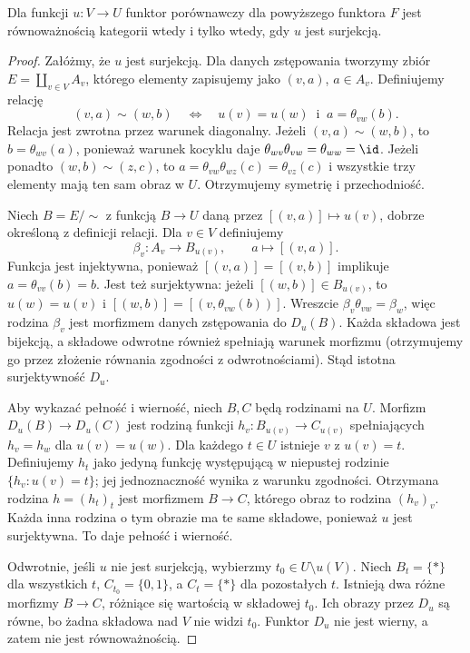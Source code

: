 \begin{twierdzenie}\label{cat:thm:set-effective-descent}
Dla funkcji $u:V\to U$ funktor porównawczy dla powyższego funktora $F$ jest równoważnością kategorii wtedy i tylko wtedy, gdy $u$ jest surjekcją.
\end{twierdzenie}
\begin{proof}
Załóżmy, że $u$ jest surjekcją. Dla danych zstępowania tworzymy zbiór $E=\coprod_{v\in V}A_v$, którego elementy zapisujemy jako $(v,a)$, $a\in A_v$. Definiujemy relację
\[
 (v,a)\sim(w,b)\quad\Longleftrightarrow\quad
 u(v)=u(w)\ \text{ i }\ a=\theta_{vw}(b).
\]
Relacja jest zwrotna przez warunek diagonalny. Jeżeli $(v,a)\sim(w,b)$, to $b=\theta_{wv}(a)$, ponieważ warunek kocyklu daje $\theta_{wv}\theta_{vw}=\theta_{ww}=\id$. Jeżeli ponadto $(w,b)\sim(z,c)$, to $a=\theta_{vw}\theta_{wz}(c)=\theta_{vz}(c)$ i wszystkie trzy elementy mają ten sam obraz w $U$. Otrzymujemy symetrię i przechodniość.

Niech $B=E/{\sim}$ z funkcją $B\to U$ daną przez $[(v,a)]\mapsto u(v)$, dobrze określoną z definicji relacji. Dla $v\in V$ definiujemy
\[
 \beta_v:A_v\longrightarrow B_{u(v)},\qquad
 a\longmapsto[(v,a)].
\]
Funkcja jest injektywna, ponieważ $[(v,a)]=[(v,b)]$ implikuje $a=\theta_{vv}(b)=b$. Jest też surjektywna: jeżeli $[(w,b)]\in B_{u(v)}$, to $u(w)=u(v)$ i $[(w,b)]=[(v,\theta_{vw}(b))]$. Wreszcie $\beta_v\theta_{vw}=\beta_w$, więc rodzina $\beta_v$ jest morfizmem danych zstępowania do $D_u(B)$. Każda składowa jest bijekcją, a składowe odwrotne również spełniają warunek morfizmu (otrzymujemy go przez złożenie równania zgodności z odwrotnościami). Stąd istotna surjektywność $D_u$.

Aby wykazać pełność i wierność, niech $B,C$ będą rodzinami na $U$. Morfizm $D_u(B)\to D_u(C)$ jest rodziną funkcji $h_v:B_{u(v)}\to C_{u(v)}$ spełniających $h_v=h_w$ dla $u(v)=u(w)$. Dla każdego $t\in U$ istnieje $v$ z $u(v)=t$. Definiujemy $h_t$ jako jedyną funkcję występującą w niepustej rodzinie $\{h_v:u(v)=t\}$; jej jednoznaczność wynika z warunku zgodności. Otrzymana rodzina $h=(h_t)_t$ jest morfizmem $B\to C$, którego obraz to rodzina $(h_v)_v$. Każda inna rodzina o tym obrazie ma te same składowe, ponieważ $u$ jest surjektywna. To daje pełność i wierność.

Odwrotnie, jeśli $u$ nie jest surjekcją, wybierzmy $t_0\in U\setminus u(V)$. Niech $B_t=\{*\}$ dla wszystkich $t$, $C_{t_0}=\{0,1\}$, a $C_t=\{*\}$ dla pozostałych $t$. Istnieją dwa różne morfizmy $B\to C$, różniące się wartością w składowej $t_0$. Ich obrazy przez $D_u$ są równe, bo żadna składowa nad $V$ nie widzi $t_0$. Funktor $D_u$ nie jest wierny, a zatem nie jest równoważnością.
\end{proof}


